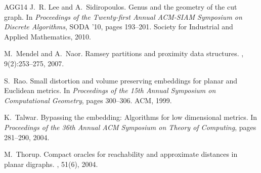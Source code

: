 \documentclass[11pt,fleqn]{article}
\begin{document}
\begin{thebibliography}{AGG{\etalchar{+}}14}
J.~R. Lee and A.~Sidiropoulos.
\newblock Genus and the geometry of the cut graph.
\newblock In {\em Proceedings of the Twenty-first Annual ACM-SIAM Symposium on
  Discrete Algorithms}, SODA '10, pages 193--201. Society for Industrial and
  Applied Mathematics, 2010.

M.~Mendel and A.~Naor.
\newblock Ramsey partitions and proximity data structures.
, 9(2):253--275, 2007.

S.~Rao.
\newblock Small distortion and volume preserving embeddings for planar and
  {E}uclidean metrics.
\newblock In {\em Proceedings of the 15th Annual Symposium on Computational
  Geometry}, pages 300--306. ACM, 1999.

K.~Talwar.
\newblock Bypassing the embedding: {A}lgorithms for low dimensional metrics.
\newblock In {\em Proceedings of the 36th Annual ACM Symposium on Theory of
  Computing}, pages 281--290, 2004.

M.~Thorup.
\newblock Compact oracles for reachability and approximate distances in planar
  digraphs.
, 51(6), 2004.

\end{thebibliography}
\end{document}
